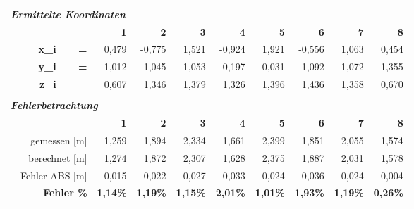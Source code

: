 \begin{table}[ht]
\begin{tabular}{r|rrr|r|r|r|r|rrr}
    \multicolumn{11}{l}{\textit{\textbf{Ermittelte Koordinaten}}} \\
    \multicolumn{1}{r}{\textit{\textbf{}}} &       &       & \multicolumn{1}{r}{\textbf{1}} & \multicolumn{1}{r}{\textbf{2}} & \multicolumn{1}{r}{\textbf{3}} & \multicolumn{1}{r}{\textbf{4}} & \multicolumn{1}{r}{\textbf{5}} & \textbf{6} & \textbf{7} & \textbf{8}\\
\cline{2-11}    \multicolumn{1}{r}{} & \textbf{x\_i} & \textbf{=} & \multicolumn{1}{r}{0,479} & \multicolumn{1}{r}{-0,775} & \multicolumn{1}{r}{1,521} & \multicolumn{1}{r}{-0,924} & \multicolumn{1}{r}{1,921} & -0,556 & 1,063 & 0,454\\
    \multicolumn{1}{r}{} & \textbf{y\_i} & \textbf{=} & \multicolumn{1}{r}{-1,012} & \multicolumn{1}{r}{-1,045} & \multicolumn{1}{r}{-1,053} & \multicolumn{1}{r}{-0,197} & \multicolumn{1}{r}{0,031} & 1,092 & 1,072 & 1,355 \\
    \multicolumn{1}{r}{} & \textbf{z\_i} & \textbf{=} & \multicolumn{1}{r}{0,607} & \multicolumn{1}{r}{1,346} & \multicolumn{1}{r}{1,379} & \multicolumn{1}{r}{1,326} & \multicolumn{1}{r}{1,396} & 1,436 & 1,358 & 0,670 \\
    \multicolumn{1}{r}{} &       &       & \multicolumn{1}{r}{} & \multicolumn{1}{r}{} & \multicolumn{1}{r}{} & \multicolumn{1}{r}{} & \multicolumn{1}{r}{} &       &       &  \\
    \multicolumn{11}{l}{\textit{\textbf{Fehlerbetrachtung}}} \\
    \multicolumn{1}{r}{} &       &       & \multicolumn{1}{r}{\textbf{1}} & \multicolumn{1}{r}{\textbf{2}} & \multicolumn{1}{r}{\textbf{3}} & \multicolumn{1}{r}{\textbf{4}} & \multicolumn{1}{r}{\textbf{5}} & \textbf{6} & \textbf{7} & \textbf{8}\\
\cline{2-11}    \multicolumn{1}{r}{} & \multicolumn{2}{r}{gemessen [m]} & \multicolumn{1}{r}{1,259} & \multicolumn{1}{r}{1,894} & \multicolumn{1}{r}{2,334} & \multicolumn{1}{r}{1,661} & \multicolumn{1}{r}{2,399} & 1,851 & 2,055 & 1,574\\
    \multicolumn{1}{r}{} & \multicolumn{2}{r}{berechnet [m]} & \multicolumn{1}{r}{1,274} & \multicolumn{1}{r}{1,872} & \multicolumn{1}{r}{2,307} & \multicolumn{1}{r}{1,628} & \multicolumn{1}{r}{2,375} & 1,887 & 2,031 & 1,578 \\
    \multicolumn{1}{r}{} & \multicolumn{2}{r}{Fehler ABS [m]} & \multicolumn{1}{r}{0,015} & \multicolumn{1}{r}{0,022} & \multicolumn{1}{r}{0,027} & \multicolumn{1}{r}{0,033} & \multicolumn{1}{r}{0,024} & 0,036 & 0,024 & 0,004 \\
    \multicolumn{1}{r}{} & \multicolumn{2}{r}{\textbf{Fehler \%}} & \multicolumn{1}{r}{\textbf{1,14\%}} & \multicolumn{1}{r}{\textbf{1,19\%}} & \multicolumn{1}{r}{\textbf{1,15\%}} & \multicolumn{1}{r}{\textbf{2,01\%}} & \multicolumn{1}{r}{\textbf{1,01\%}} & \textbf{1,93\%} & \textbf{1,19\%} & \textbf{0,26\%} \\
    \end{tabular}%
  \label{tab:addlabel}%
\end{table}%
